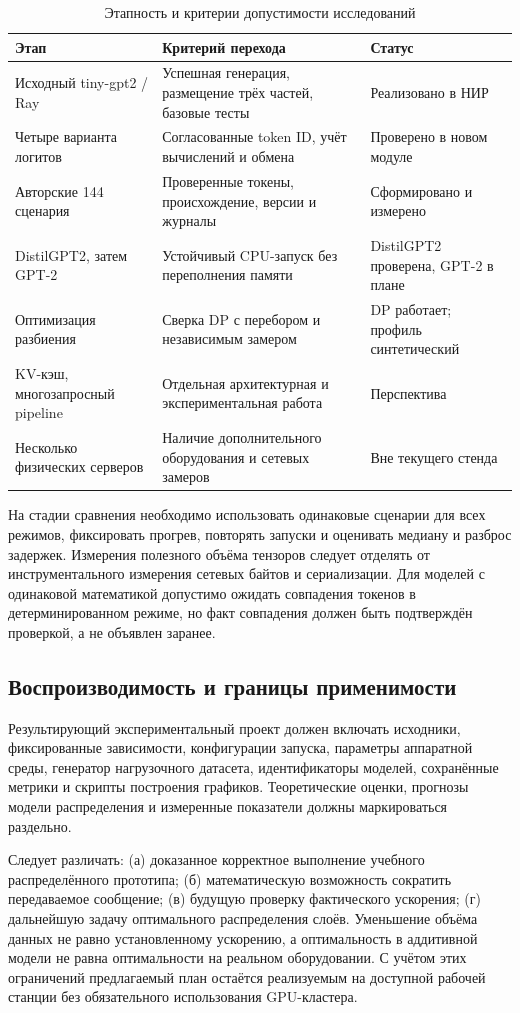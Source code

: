 \begin{table}[t]
\centering\small
\caption{Этапность и критерии допустимости исследований}
\label{tab:plan}
\begin{tabularx}{\textwidth}{@{}p{3.2cm}X p{3.0cm}@{}}
\toprule
\textbf{Этап} & \textbf{Критерий перехода} & \textbf{Статус}\\
\midrule
Исходный tiny-gpt2 / Ray & Успешная генерация, размещение трёх частей, базовые тесты & Реализовано в НИР\\
Четыре варианта логитов & Согласованные token ID, учёт вычислений и обмена & Проверено в новом модуле\\
Авторские 144 сценария & Проверенные токены, происхождение, версии и журналы & Сформировано и измерено\\
DistilGPT2, затем GPT-2 & Устойчивый CPU-запуск без переполнения памяти & DistilGPT2 проверена, GPT-2 в плане\\
Оптимизация разбиения & Сверка DP с перебором и независимым замером & DP работает; профиль синтетический\\
KV-кэш, многозапросный pipeline & Отдельная архитектурная и экспериментальная работа & Перспектива\\
Несколько физических серверов & Наличие дополнительного оборудования и сетевых замеров & Вне текущего стенда\\
\bottomrule
\end{tabularx}
\end{table}

На стадии сравнения необходимо использовать одинаковые сценарии для всех режимов, фиксировать прогрев, повторять запуски и оценивать медиану и разброс задержек. Измерения полезного объёма тензоров следует отделять от инструментального измерения сетевых байтов и сериализации. Для моделей с одинаковой математикой допустимо ожидать совпадения токенов в детерминированном режиме, но факт совпадения должен быть подтверждён проверкой, а не объявлен заранее.

\subsection{Воспроизводимость и границы применимости}

Результирующий экспериментальный проект должен включать исходники, фиксированные зависимости, конфигурации запуска, параметры аппаратной среды, генератор нагрузочного датасета, идентификаторы моделей, сохранённые метрики и скрипты построения графиков. Теоретические оценки, прогнозы модели распределения и измеренные показатели должны маркироваться раздельно.

Следует различать: (а) доказанное корректное выполнение учебного распределённого прототипа; (б) математическую возможность сократить передаваемое сообщение; (в) будущую проверку фактического ускорения; (г) дальнейшую задачу оптимального распределения слоёв. Уменьшение объёма данных не равно установленному ускорению, а оптимальность в аддитивной модели не равна оптимальности на реальном оборудовании. С учётом этих ограничений предлагаемый план остаётся реализуемым на доступной рабочей станции без обязательного использования GPU-кластера.
